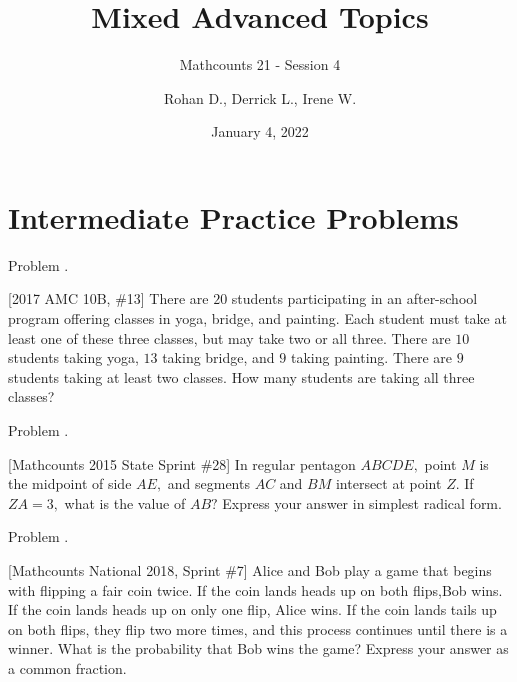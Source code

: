 \documentclass[9pt]{beamer}
\title{Mixed Advanced Topics}
\subtitle{Mathcounts 21 - Session 4}
\author{Rohan D., Derrick L., Irene W.}
\institute{BISV Mathcounts Club 21}
\date{January 4, 2022}
\newcounter{problem}[section]
\begin{document}
\begin{frame}
    \titlepage        
\end{frame}

\setcounter{section}{2}

\section{Intermediate Practice Problems}

\begin{frame}[t, fragile]{Problem \thesection.\theproblem}
    \begin{block}{}[2017 AMC 10B, \#13]
There are $20$ students participating in an after-school program offering classes in yoga, bridge, and painting. Each student must take at least one of these three classes, but may take two or all three. There are $10$ students taking yoga, $13$ taking bridge, and $9$ taking painting. There are $9$ students taking at least two classes. How many students are taking all three classes?
    
    \end{block}
\end{frame}


\begin{frame}[t, fragile]{Problem \thesection.\theproblem}
    \begin{block}{}[Mathcounts 2015 State Sprint \#28]
In regular pentagon $ABCDE,$ point $M$ is the midpoint of side $AE,$ and segments
$AC$ and $BM$ intersect at point $Z.$ If $ZA = 3,$ what is the value of $AB?$ Express
your answer in simplest radical form.

    \end{block}
\end{frame}


\begin{frame}[t, fragile]{Problem \thesection.\theproblem}
    \begin{block}{}[Mathcounts National 2018, Sprint \#7]
    Alice and Bob play a game that begins with flipping a fair coin twice. If the coin lands heads up on both flips,Bob wins. If the coin lands heads up on only one flip, Alice wins. If the coin lands tails up on both flips, they flip two more times, and this process continues until there is a winner. What is the probability that Bob wins the game? Express your answer as a common fraction.
    
    \end{block}
\end{frame}
\end{document}
